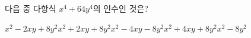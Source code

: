 다음 중 다항식 $x^4+64y^4$의 인수인 것은?
\begin{choicesii}{$x^2-2xy+8y^2$}{$x^2+2xy+8y^2$}{$x^2-4xy-8y^2$}{$x^2+4xy+8y^2$}{$x^2-8y^2$}\end{choicesii}
